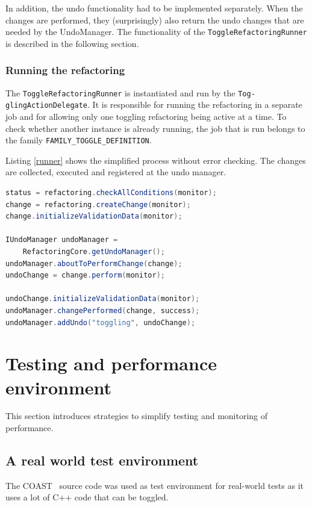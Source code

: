In addition, the undo functionality had to be implemented separately. When the 
changes are performed, they (surprisingly) also return the undo changes that are 
needed by the UndoManager. The functionality of the 
\texttt{ToggleRefactoringRunner} is described in the following section.

\subsubsection{Running the refactoring}\label{runnersec}
The \texttt{ToggleRefactoringRunner} is instantiated and run by the 
\texttt{Tog- glingActionDelegate}. It is responsible for running the refactoring 
in a separate job and for allowing only one toggling refactoring being active at 
a time. To check whether another instance is already running, the job that is 
run belongs to the family \texttt{FAMILY\_TOGGLE\_DEFINITION}.

Listing \ref{runner} shows the simplified process without error checking. The 
changes are collected, executed and registered at the undo manager.

\begin{lstlisting}[caption={running the refactoring},label={runner},language=java]
status = refactoring.checkAllConditions(monitor);
change = refactoring.createChange(monitor);
change.initializeValidationData(monitor);

IUndoManager undoManager = 
    RefactoringCore.getUndoManager();
undoManager.aboutToPerformChange(change);
undoChange = change.perform(monitor);

undoChange.initializeValidationData(monitor);
undoManager.changePerformed(change, success);
undoManager.addUndo("toggling", undoChange);
\end{lstlisting}

\section{Testing and performance environment}

This section introduces strategies to simplify testing and monitoring of 
performance.

\subsection{A real world test environment}
The COAST~\cite{COAST} source code was used as test environment for real-world 
tests as it uses a lot of C++ code that can be toggled.

